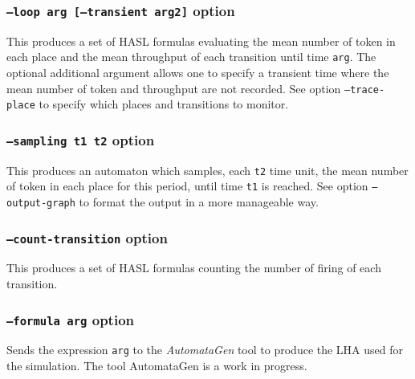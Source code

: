 \documentclass{article}
\begin{document}
\subsubsection{\texttt{--loop arg [--transient arg2]}  option}
This produces a set of HASL formulas evaluating the mean number of 
token in each place and the mean throughput of each transition until time
\texttt{arg}. The optional additional argument allows one to specify a transient
time where the mean number of token and throughput are not recorded.
See option \texttt{--trace-place} to specify which places and transitions 
to monitor.

\subsubsection{\texttt{--sampling t1 t2} option}
This produces an automaton which samples, each \texttt{t2} time unit, the
mean number of token in each place for this period, until time
\texttt{t1} is reached.  See option \texttt{--output-graph} to format
the output in a more manageable way.

\subsubsection{\texttt{--count-transition} option}
This produces a set of HASL formulas counting the number of firing of each
transition.

\subsubsection{\texttt{--formula arg} option}
Sends the expression \texttt{arg} to the \emph{AutomataGen} tool to produce
the LHA used for the simulation. The tool AutomataGen is a work in progress.
\end{document}

